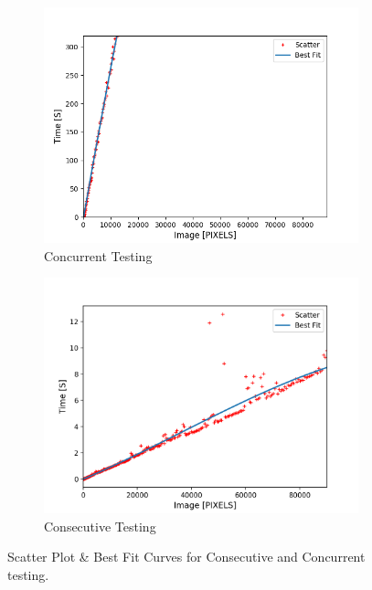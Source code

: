 \documentclass{article}
\begin{document}
\begin{figure}[ht]
\centering
\begin{subfigure}{.5\textwidth}
  \centering
  \includegraphics[width=\linewidth]{tests/concurent.png}
  \caption{Concurrent Testing}
  \label{fig:sub1}
\end{subfigure}%
\begin{subfigure}{.5\textwidth}
  \centering
  \includegraphics[width=\linewidth]{tests/consecutive.png}
  \caption{Consecutive Testing}
  \label{fig:sub2}
\end{subfigure}
\caption{Scatter Plot  \& Best Fit Curves for Consecutive and Concurrent testing. }
\label{fig:concurrency_test}
\end{figure}
\end{document}
